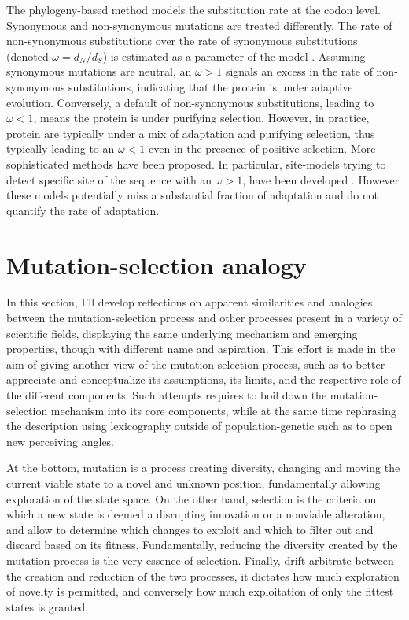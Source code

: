 The phylogeny-based method models the substitution rate at the codon level. Synonymous and non-synonymous mutations are treated differently. The rate of non-synonymous substitutions over the rate of synonymous substitutions (denoted $\omega=d_N/d_S$) is estimated as a parameter of the model \cite{Muse1994,Goldman1994}. Assuming synonymous mutations are neutral, an $\omega>1$ signals an excess in the rate of non-synonymous substitutions, indicating that the protein is under adaptive evolution. Conversely, a default of non-synonymous substitutions, leading to $\omega<1$, means the protein is under purifying selection. However, in practice, protein are typically under a mix of adaptation and purifying selection, thus typically leading to an $\omega<1$ even in the presence of positive selection. More sophisticated methods have been proposed. In particular, site-models trying to detect specific site of the sequence with an $\omega>1$, have been developed \cite{Yang2001, kosiol_patterns_2008}.
However these models potentially miss a substantial fraction of adaptation and do not quantify the rate of adaptation.  \\


\section{Mutation-selection analogy}
In this section, I'll develop reflections on apparent similarities and analogies between the mutation-selection process and other processes present in a variety of scientific fields, displaying the same underlying mechanism and emerging properties, though with different name and aspiration.
This effort is made in the aim of giving another view of the mutation-selection process, such as to better appreciate and conceptualize its assumptions, its limits, and the respective role of the different components. 
Such attempts requires to boil down the mutation-selection mechanism into its core components, while at the same time rephrasing the description using lexicography outside of population-genetic such as to open new perceiving angles.

At the bottom, mutation is a process creating diversity, changing and moving the current viable state to a novel and unknown position, fundamentally allowing exploration of the state space.
On the other hand, selection is the criteria on which a new state is deemed a disrupting innovation or a nonviable alteration, and allow to determine which changes to exploit and which to filter out and discard based on its fitness.
Fundamentally, reducing the diversity created by the mutation process is the very essence of selection.
Finally, drift arbitrate between the creation and reduction of the two processes, it dictates how much exploration of novelty is permitted, and conversely how much exploitation of only the fittest states is granted.

